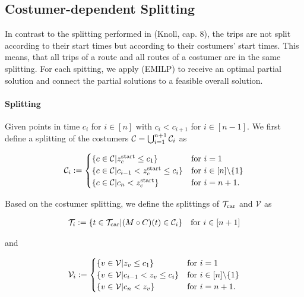 \subsection{Costumer-dependent Splitting}

In contrast to the splitting performed in (Knoll, cap. 8), the trips are not split according to their start times but according to their costumers' start times. This means, that all trips of a route and all routes of a costumer are in the same splitting. For each spitting, we apply (EMILP) to receive an optimal partial solution and connect the partial solutions to a feasible overall solution.

\paragraph{Splitting} \parfill


Given points in time $c_i$ for $i\in[n]$ with $c_i<c_{i+1}$ for $i\in[n-1]$. We first define a splitting of the costumers $\mathcal{C}=\bigcup_{i=1}^{n+1}\mathcal{C}_i$ as

\begin{align*}
	\mathcal{C}_i := \begin{cases}
		\left\{c\in\mathcal{C}|z^{\operatorname{start}}_c\leq c_1\right\} & \text{for } i=1 \\
		\left\{c\in\mathcal{C}|c_{i-1}<z^{\operatorname{start}}_c\leq c_i\right\} & \text{for } i\in[n]\backslash\{1\} \\
		\left\{c\in\mathcal{C}|c_n<z^{\operatorname{start}}_c\right\} & \text{for } i=n+1.
	\end{cases}
\end{align*}

Based on the costumer splitting, we define the splittings of $\mathcal{T}_{\operatorname{car}}$ and $\mathcal{V}$ as

\begin{align*}
	\mathcal{T}_i := \left\{t\in\mathcal{T}_{\operatorname{car}}|(M\circ C)(t)\in\mathcal{C}_i\right\} && \text{for } i\in[n+1]
\end{align*}

and

\begin{align*}
	\mathcal{V}_i := \begin{cases}
		\left\{v\in\mathcal{V}|z_v\leq c_1\right\} & \text{for } i=1 \\
		\left\{v\in\mathcal{V}|c_{i-1}<z_v\leq c_i\right\} & \text{for } i\in[n]\backslash\{1\} \\
		\left\{v\in\mathcal{V}|c_n<z_v\right\} & \text{for } i=n+1.
	\end{cases}
\end{align*}

